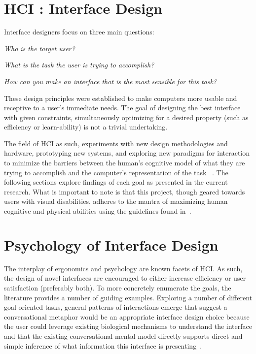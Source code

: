 \section{                 HCI : Interface Design                             }

Interface designers focus on three main questions:

\textit{Who is the target user?}

\textit{What is the task the user is trying to accomplish?}

\textit{How can you make an interface that is the most sensible for this task?}

These design principles were established to make computers more usable and
receptive to a user's immediate needs. The goal of designing the best interface
with given constraints, simultaneously optimizing for a desired property (such
as efficiency or learn-ability) is not a trivial undertaking.

The field of HCI as such, experiments with new design methodologies and
hardware, prototyping new systems, and exploring new paradigms for interaction
to minimize the  barriers between the human's cognitive model of what they are
trying to accomplish and the computer's representation of the task
~\cite{baecker1987human}. The following sections explore findings of each goal
as presented in the current research.  What is important to note is that this
project, though geared towards users with visual disabilities, adheres to
the mantra of maximizing human cognitive and physical abilities using the
guidelines found in~\cite{reeves2004guidelines}.

\section{                  Psychology of Interface Design                    }

The interplay of ergonomics and psychology are known facets of HCI. As such, 
the design of novel interfaces are encouraged to either increase efficiency or 
user satisfaction (preferably both). To more concretely enumerate the goals, 
the literature provides a number of guiding examples.  Exploring a number of 
different goal oriented tasks, general patterns of interactions emerge that 
suggest a conversational metaphor would be an appropriate interface design 
choice because the user could leverage existing biological mechanisms to 
understand the interface and that the existing conversational mental model 
directly supports direct and simple inference of what information this 
interface is presenting~\cite{kieras1984role}.

